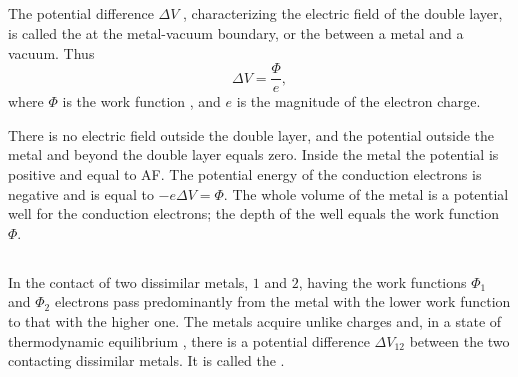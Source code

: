\subsection{}\label{41.11.3} The potential difference $\Delta V$ , characterizing the electric field of the double layer, is called the  at the metal-vacuum boundary, or the  between a metal and a vacuum. Thus 
\begin{equation*}%
\Delta V = \frac{\Phi}{e},
\end{equation*}
where $\Phi$ is the work function , and $e$ is the magnitude of the electron charge.

There is no electric field outside the double layer, and the potential outside the metal and beyond the double layer equals
zero. Inside the metal the potential is positive and equal to AF. The potential energy of the conduction electrons  is negative and is equal to $- e \Delta V = \Phi$. The whole volume of the metal is a potential well  for the conduction electrons; the depth of the well equals the work function $\Phi$.

\subsection{}\label{41.11.4} In the contact of two dissimilar metals, $\mathit{1}$ and $\mathit{2}$, having the work functions $\Phi_{1}$ and $\Phi_{2}$ electrons pass predominantly from the metal with the lower work function to that with the higher one. The metals acquire unlike charges and, in a state of thermodynamic equilibrium , there is a potential difference $\Delta V_{12}$ between the two contacting dissimilar metals. It is called the .

